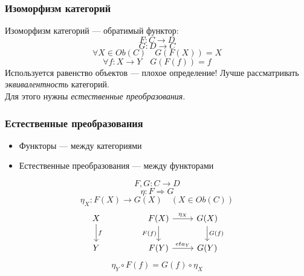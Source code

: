 \documentclass{beamer}
\begin{document}
\begin{frame}
\frametitle{Изоморфизм категорий}
Изоморфизм категорий --- обратимый функтор:
\begin{equation}F : C \rightarrow D\end{equation}
\begin{equation}G : D \rightarrow C\end{equation}
\begin{equation}\forall X \in Ob(C) \quad G(F(X)) = X\end{equation}
\begin{equation}\forall f:X\rightarrow Y \quad G(F(f)) = f\end{equation}
\pause
Используется равенство объектов --- плохое определение!
\pause
Лучше рассматривать \textit{эквивалентность} категорий. \\
Для этого нужны \textit{естественные преобразования}.
\end{frame}

\begin{frame}[fragile]
\frametitle{Естественные преобразования}
\begin{itemize}
\item Функторы --- между категориями
\pause
\item Естественные преобразования --- между функторами
\end{itemize}
\pause
\begin{equation}F, G: C \rightarrow D\end{equation}
\pause
\begin{equation}\eta: F \Rightarrow G\end{equation}
\begin{equation}\eta_X:F(X) \rightarrow G(X) \quad (X\in Ob(C))\end{equation}
\pause
\begin{equation}
\begin{tikzcd}
X \arrow{d}{f} && F(X) \arrow{d}[swap]{F(f)} \arrow{r}{\eta_X} & G(X) \arrow{d}{G(f)} \\
Y && F(Y) \arrow{r}{eta_Y} & G(Y)
\end{tikzcd}
\end{equation}
\begin{equation}\eta_Y \circ F(f) = G(f) \circ \eta_X\end{equation}
\end{frame}
\end{document}
